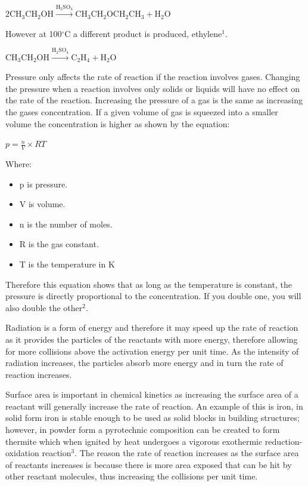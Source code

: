 $\mathrm{2CH_3CH_2OH}\xrightarrow{\mathrm{H_2SO_4}}\mathrm{CH_3CH_2OCH_2CH_3}+\mathrm{H_2O}$

However at 100$^{\circ}$C a different product is produced, ethylene$^1$.

$\mathrm{CH_3CH_2OH}\xrightarrow{\mathrm{H_2SO_4}}\mathrm{C_2H_4}+\mathrm{H_2O}$

Pressure only affects the rate of reaction if the reaction involves gases. Changing the pressure when a reaction involves only solids or liquids will have no effect on the rate of the reaction. Increasing the pressure of a gas is the same as increasing the gases concentration. If a given volume of gas is squeezed into a smaller volume the concentration is higher as shown by the equation:

 $p= \frac{n}{V}\times{RT}$

Where:
\begin{itemize}
\item p is pressure.
\item V is volume.
\item n is the number of moles.
\item R is the gas constant.
\item T is the temperature in K
\end{itemize}

Therefore this equation shows that as long as the temperature is constant, the pressure is directly proportional to the concentration. If you double one, you will also double the other$^2$.

Radiation is a form of energy and therefore it may speed up the rate of reaction as it provides the particles of the reactants with more energy, therefore allowing for more collisions above the activation energy per unit time. As the intensity of radiation increases, the particles absorb more energy and in turn the rate of reaction increases.

Surface area is important in chemical kinetics as increasing the surface area of a reactant will generally increase the rate of reaction. An example of this is iron, in solid form iron is stable enough to be used as solid blocks in building structures; however, in powder form a pyrotechnic composition can be created to form thermite which when ignited by heat undergoes a vigorous exothermic reduction-oxidation reaction$^3$. The reason the rate of reaction increases as the surface area of reactants increases is because there is more area exposed that can be hit by other reactant molecules, thus increasing the collisions per unit time.

